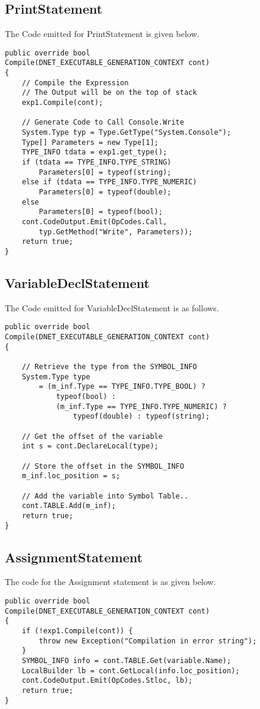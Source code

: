 \subsection{PrintStatement}
The Code emitted for PrintStatement is given below.
\lstset{style=csharp}
\begin{lstlisting}
public override bool 
Compile(DNET_EXECUTABLE_GENERATION_CONTEXT cont)
{
	// Compile the Expression
	// The Output will be on the top of stack
	exp1.Compile(cont);
	
	// Generate Code to Call Console.Write
	System.Type typ = Type.GetType("System.Console");
	Type[] Parameters = new Type[1];
	TYPE_INFO tdata = exp1.get_type();
	if (tdata == TYPE_INFO.TYPE_STRING)
		Parameters[0] = typeof(string);
	else if (tdata == TYPE_INFO.TYPE_NUMERIC)
		Parameters[0] = typeof(double);
	else
		Parameters[0] = typeof(bool);
	cont.CodeOutput.Emit(OpCodes.Call, 
		typ.GetMethod("Write", Parameters));
	return true;
}
\end{lstlisting}
\subsection{VariableDeclStatement}
The Code emitted for VariableDeclStatement is as follows.

\lstset{style=csharp}
\begin{lstlisting}
public override bool 
Compile(DNET_EXECUTABLE_GENERATION_CONTEXT cont)
{

	// Retrieve the type from the SYMBOL_INFO
	System.Type type 
		= (m_inf.Type == TYPE_INFO.TYPE_BOOL) ?
			typeof(bool) : 
			(m_inf.Type == TYPE_INFO.TYPE_NUMERIC) ?
				typeof(double) : typeof(string);

	// Get the offset of the variable
	int s = cont.DeclareLocal(type);

	// Store the offset in the SYMBOL_INFO
	m_inf.loc_position = s;
	
	// Add the variable into Symbol Table..
	cont.TABLE.Add(m_inf);
	return true;
}
\end{lstlisting}
\subsection{AssignmentStatement}
The code for the Assignment statement is as given below.
\lstset{style=csharp}
\begin{lstlisting}
public override bool 
Compile(DNET_EXECUTABLE_GENERATION_CONTEXT cont)
{
	if (!exp1.Compile(cont)) {
		throw new Exception("Compilation in error string");
	}
	SYMBOL_INFO info = cont.TABLE.Get(variable.Name);
	LocalBuilder lb = cont.GetLocal(info.loc_position);
	cont.CodeOutput.Emit(OpCodes.Stloc, lb);
	return true;
}
\end{lstlisting}

